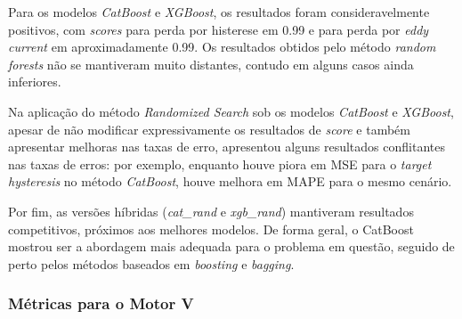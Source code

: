 \documentclass{article}
\begin{document}
Para os modelos \textit{CatBoost} e \textit{XGBoost}, os resultados foram consideravelmente positivos, com \textit{scores} para perda por histerese em 0.99 e para perda por \textit{eddy current} em aproximadamente 0.99. Os resultados obtidos pelo método \textit{random forests} não se mantiveram muito distantes, contudo em alguns casos ainda inferiores.

Na aplicação do método \textit{Randomized Search} sob os modelos \textit{CatBoost} e \textit{XGBoost}, apesar de não modificar expressivamente os resultados de \textit{score} e também apresentar melhoras nas taxas de erro, apresentou alguns resultados conflitantes nas taxas de erros: por exemplo, enquanto houve piora em MSE para o \textit{target hysteresis} no método \textit{CatBoost}, houve melhora em MAPE para o mesmo cenário.

Por fim, as versões híbridas (\textit{cat\_rand} e \textit{xgb\_rand}) mantiveram resultados competitivos, próximos aos melhores modelos. De forma geral, o CatBoost mostrou ser a abordagem mais adequada para o problema em questão, seguido de perto pelos métodos baseados em \textit{boosting} e \textit{bagging}.

\newpage

\subsubsection{Métricas para o Motor V}
\end{document}
